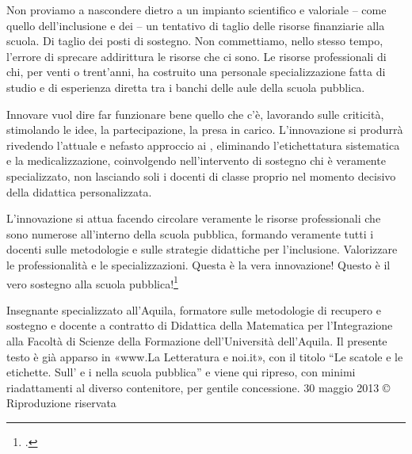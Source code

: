 Non proviamo a nascondere dietro a un impianto scientifico e valoriale – come quello dell'inclusione e dei  – un tentativo di taglio delle risorse finanziarie alla scuola. Di taglio dei posti di sostegno. Non commettiamo, nello stesso tempo, l'errore di sprecare addirittura le risorse che ci sono. Le risorse professionali di chi, per venti o trent'anni, ha costruito una personale specializzazione fatta di studio e di esperienza diretta tra i banchi delle aule della scuola pubblica.

Innovare vuol dire far funzionare bene quello che c'è, lavorando sulle criticità, stimolando le idee, la partecipazione, la presa in carico. L'innovazione si produrrà rivedendo l'attuale e nefasto approccio ai , eliminando l'etichettatura sistematica e la medicalizzazione, coinvolgendo nell'intervento di sostegno chi è veramente specializzato, non lasciando soli i docenti di classe proprio nel momento decisivo della didattica personalizzata.

L'innovazione si attua facendo circolare veramente le risorse professionali che sono numerose all'interno della scuola pubblica, formando veramente tutti i docenti sulle metodologie e sulle strategie didattiche per l'inclusione. Valorizzare le professionalità e le specializzazioni. Questa è la vera innovazione! Questo è il vero sostegno alla scuola pubblica!\footcite{scataglini1}

Insegnante specializzato all'Aquila, formatore sulle metodologie di recupero e sostegno e docente a contratto di Didattica della Matematica per l'Integrazione alla Facoltà di Scienze della Formazione dell'Università dell'Aquila. Il presente testo è già apparso in «www.La Letteratura e noi.it», con il titolo “Le scatole e le etichette. Sull' e i  nella scuola pubblica” e viene qui ripreso, con minimi riadattamenti al diverso contenitore, per gentile concessione. 
30 maggio 2013
© Riproduzione riservata
